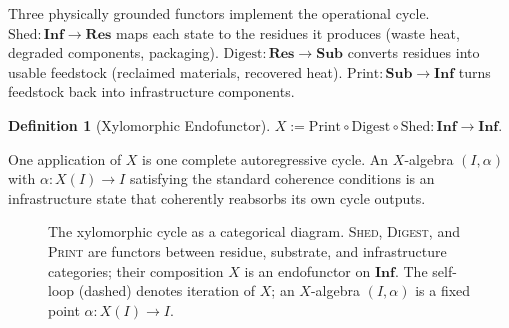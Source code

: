 \documentclass[10pt,twocolumn]{article}
\theoremstyle{plain}
\theoremstyle{definition}
\newtheorem{definition}[theorem]{Definition}
\theoremstyle{remark}
\begin{document}
Three physically grounded functors implement the operational cycle.
$\mathrm{Shed} : \mathbf{Inf} \to \mathbf{Res}$ maps each state to the
residues it produces (waste heat, degraded components, packaging).
$\mathrm{Digest} : \mathbf{Res} \to \mathbf{Sub}$ converts residues
into usable feedstock (reclaimed materials, recovered heat).
$\mathrm{Print} : \mathbf{Sub} \to \mathbf{Inf}$ turns feedstock back
into infrastructure components.

\begin{definition}[Xylomorphic Endofunctor]
$X := \mathrm{Print} \circ \mathrm{Digest} \circ \mathrm{Shed} :
\mathbf{Inf} \to \mathbf{Inf}.$
\end{definition}

One application of $X$ is one complete autoregressive cycle. An
$X$-algebra $(I, \alpha)$ with $\alpha : X(I) \to I$ satisfying the
standard coherence conditions is an infrastructure state that
coherently reabsorbs its own cycle outputs.

\begin{figure}[t]
\centering
{}
\caption{The xylomorphic cycle as a categorical diagram.
\textsc{Shed}, \textsc{Digest}, and \textsc{Print} are functors
between residue, substrate, and infrastructure categories; their
composition $X$ is an endofunctor on $\mathbf{Inf}$.
The self-loop (dashed) denotes iteration of $X$; an $X$-algebra
$(I,\alpha)$ is a fixed point $\alpha : X(I) \to I$.}
\label{fig:cycle}
\end{figure}
\end{document}
